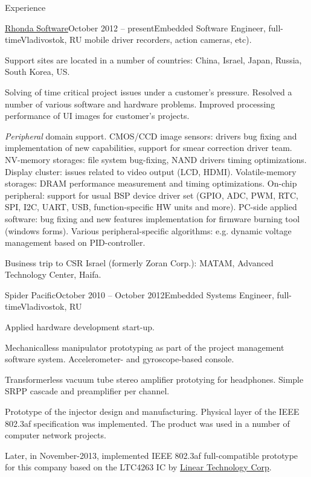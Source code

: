 \documentclass{template}
\begin{document}
\begin{rSection}{Experience}
\begin{rCompany}{\href{http://www.rhondasoftware.com}{Rhonda Software}}{October 2012 -- present}{Embedded Software Engineer, full-time}{Vladivostok, RU}
      mobile driver recorders, action cameras, etc).
\item Support sites are located in a number of countries: China, Israel, Japan, Russia, South Korea, US.
\item Solving of time critical project issues under a customer's pressure. Resolved a number of various  software and hardware
      problems. Improved processing performance of UI images for customer's projects.
\item \textit{Peripheral} domain support. CMOS/CCD image sensors: drivers bug fixing and implementation of new capabilities, support for smear
      correction driver team. NV-memory storages: file system bug-fixing, NAND drivers timing optimizations. Display cluster: issues related to
      video output (LCD, HDMI). Volatile-memory storages: DRAM performance measurement and timing optimizations. On-chip peripheral: support for
      usual BSP device driver set (GPIO, ADC, PWM, RTC, SPI, I2C, UART, USB, function-specific HW units and more). PC-side applied software: bug
      fixing and new features implementation for firmware burning tool (windows forms). Various peripheral-specific algorithms: e.g. dynamic
      voltage management based on PID-controller.
\item Business trip to CSR Israel (formerly Zoran Corp.): MATAM, Advanced Technology Center, Haifa. \newline

\end{rCompany}
\begin{rCompany}{Spider Pacific}{October 2010 -- October 2012}{Embedded Systems Engineer, full-time}{Vladivostok, RU}

\item Applied hardware development start-up.
\item Mechanicalless manipulator prototyping as part of the project management software system. \newline Accelerometer- and gyroscope-based console.
\item Transformerless vacuum tube stereo amplifier prototying for headphones. \newline Simple SRPP cascade and preamplifier per channel.
\item Prototype of the  injector design and manufacturing. Physical layer of the IEEE
      802.3af specification was implemented. The product was used in a number of computer network projects.
\item Later, in November-2013, implemented IEEE 802.3af full-compatible prototype for this company based on the LTC4263 IC by
      \href{http://www.linear.com}{Linear Technology Corp}.

\end{rCompany}
\end{rSection}
\end{document}
